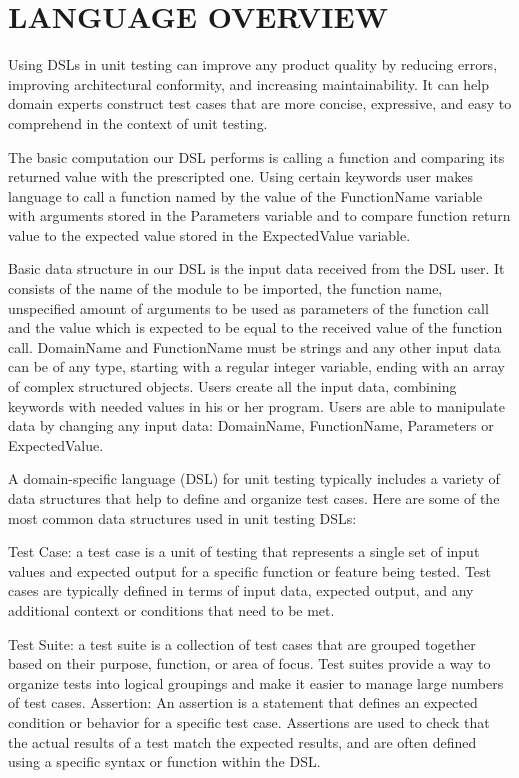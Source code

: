 \chapter{LANGUAGE OVERVIEW}

Using DSLs in unit testing can improve any product quality by reducing errors, improving architectural conformity, and increasing maintainability. It can help domain experts construct test cases that are more concise, expressive, and easy to comprehend in the context of unit testing.

The basic computation our DSL performs is calling a function and comparing its returned value with the prescripted one. Using certain keywords user makes language to call a function named by the value of the FunctionName variable with arguments stored in the Parameters variable and to compare function return value to the expected value stored in the ExpectedValue variable.

Basic data structure in our DSL is the input data received from the DSL user. It consists of the name of the module to be imported, the function name, unspecified amount of arguments to be used as parameters of the function call and the value which is expected to be equal to the received value of the function call. DomainName and FunctionName must be strings and any other input data can be of any type, starting with a regular integer variable, ending with an array of complex structured objects. Users create all the input data, combining keywords with needed values in his or her program. Users are able to manipulate data by changing any input data: DomainName, FunctionName, Parameters or ExpectedValue.

A domain-specific language (DSL) for unit testing typically includes a variety of data structures that help to define and organize test cases. Here are some of the most common data structures used in unit testing DSLs:

Test Case: a test case is a unit of testing that represents a single set of input values and expected output for a specific function or feature being tested. Test cases are typically defined in terms of input data, expected output, and any additional context or conditions that need to be met.

Test Suite: a test suite is a collection of test cases that are grouped together based on their purpose, function, or area of focus. Test suites provide a way to organize tests into logical groupings and make it easier to manage large numbers of test cases.
Assertion: An assertion is a statement that defines an expected condition or behavior for a specific test case. Assertions are used to check that the actual results of a test match the expected results, and are often defined using a specific syntax or function within the DSL.

